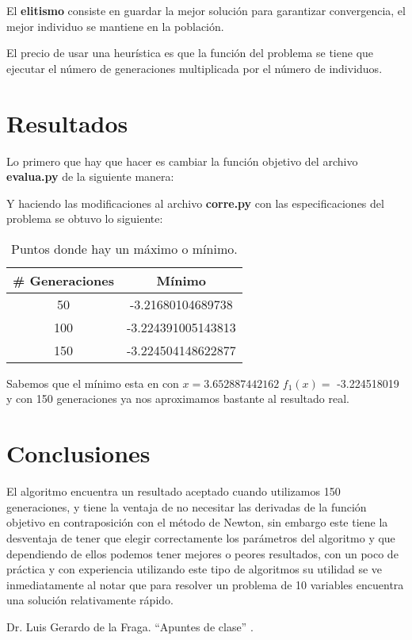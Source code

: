 \documentclass[conference]{IEEEtran}
\begin{document}
El \textbf{elitismo} consiste en guardar la mejor solución para garantizar convergencia, el mejor individuo se mantiene en la población.

El precio de usar una heurística es que la función del problema
se tiene que ejecutar el número de generaciones multiplicada por el
número de individuos.




\section{Resultados}

Lo primero que hay que hacer es cambiar la función objetivo del archivo \textbf{evalua.py} de la siguiente manera:




Y haciendo las modificaciones al archivo \textbf{corre.py} con las especificaciones del problema se obtuvo lo siguiente:

\begin{table}[!hbp]   
	\caption{Puntos donde hay un máximo o mínimo.}                                                                                                                
		\centering                                       
		\begin{tabular}{cc}
			\hline                                             
			\#{} Generaciones & Mínimo \\                     
			\hline 
			50 & -3.21680104689738\\                                            
			100 & -3.224391005143813\\
			150 & -3.224504148622877\\
			\hline                                             
		\end{tabular}
	\end{table}	
	
	Sabemos que el mínimo esta en con $x = 3.652887442162$ $f_{1}(x)= $ -3.224518019 y con 150 generaciones ya nos aproximamos bastante al resultado real.


\section{Conclusiones}

El algoritmo encuentra un resultado aceptado cuando utilizamos 150 generaciones, y tiene la ventaja de no necesitar las derivadas de la función objetivo en contraposición con el método de Newton, sin embargo este  tiene la desventaja de tener que elegir correctamente los parámetros del algoritmo y que dependiendo de ellos podemos tener mejores o peores resultados, con un poco de práctica y con experiencia utilizando este tipo de algoritmos su utilidad se ve inmediatamente al notar que para resolver un problema de 10 variables encuentra una solución relativamente rápido.

\begin{thebibliography}{00}
  Dr. Luis Gerardo de la Fraga. ``Apuntes de clase'' .
\end{thebibliography}
\end{document}
